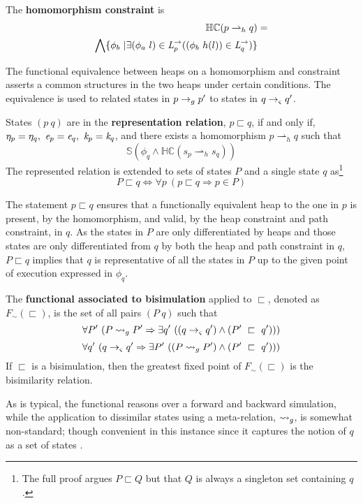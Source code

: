 \begin{definition}
\label{def:hc}
The \textbf{homomorphism constraint} is
\begin{align*}
\mathbb{HC}(p \rightharpoonup_{h} q) &= \\
 \bigwedge \{ \phi_b\ | \exists (\phi_a\ l) \in \emph{L}_p^\rightarrow ( (\phi_b\ h(l)) \in \emph{L}_q^\rightarrow)\} 
\end{align*}
\end{definition}
The functional equivalence between heaps on a homomorphism and
constraint asserts a common structures in the two heaps under certain
conditions. The equivalence is used to related states in $p \rightarrow_{g}
p^\prime$ to states in $q \rightarrow_{\varsigma} q^\prime$.
\begin{definition}
\label{representation}
States $(p\ q)$ are in the \textbf{representation relation}, $p \sqsubset q$, if and only if, $\eta_p = \eta_q ,\ \cfgnt{e}_p =
\cfgnt{e}_q ,\ \cfgnt{k}_p = \cfgnt{k}_q$, and there exists a
homomorphism $p \rightharpoonup_{h}
q$ such that
\begin{equation}
\label{eqn:valid}
 \mathbb{S}( \phi_q \wedge \mathbb{HC}(s_p \rightharpoonup_{h} s_q) ) 
\end{equation}
The represented relation is extended to sets of states $P$ and a single state $q$ as\footnote{The full proof argues $P \sqsubset Q$ but that $Q$ is
  always a singleton set containing $q$.}
$$
P \sqsubset q \Longleftrightarrow \forall p\ (p \sqsubset q \Rightarrow p \in P)
$$
\end{definition}
The statement $p \sqsubset q$ ensures that a functionally equivalent
heap to the one in $p$ is present, by the homomorphism, and valid, by
the heap constraint and path constraint, in $q$. As the states in $P$
are only differentiated by heaps and those states are only
differentiated from $q$ by both the heap and path constraint in $q$,
$P \sqsubset q$ implies that $q$ is representative of all the states
in $P$ up to the given point of execution expressed in $\phi_q$.
\begin{definition}
\label{bisimulation}
The \textbf{functional associated to bisimulation} applied to $\sqsubset$, denoted as $F_\sim(\sqsubset)$, is the set of all pairs
$(P\ q)$ such that
\begin{equation}
\label{eqn:BisimulationForwards}
\forall P^\prime\ ( P \leadsto_{g} P^\prime \Rightarrow \exists q^\prime\ ( (q \rightarrow_{\varsigma} q^\prime )\wedge (P^\prime\ \sqsubset\ q^\prime )))
\end{equation}
\begin{equation}
\label{eqn:BisimulationBackwards}
\forall q^\prime\ ( q \rightarrow_{\varsigma} q^\prime\Rightarrow \exists P^\prime\ ( (P \leadsto_{g} P^\prime )\wedge (P^\prime\ \sqsubset\ q^\prime )))
\end{equation}
If $\sqsubset$ is a bisimulation, then the greatest fixed point of $F_\sim(\sqsubset)$ is the bisimilarity relation.
\end{definition}
As is typical, the functional reasons over a forward and backward
simulation, while the application to dissimilar states using a
meta-relation, $\leadsto_{g}$, is somewhat non-standard; though convenient
in this instance since it captures the notion of $q$ as a set of
states \cite{GSE:barbedbisimulation}. 

